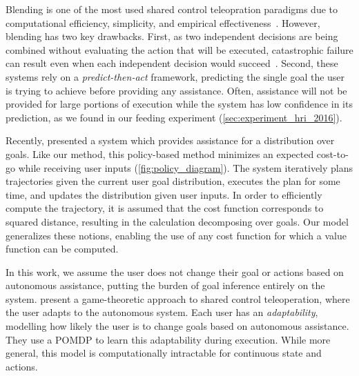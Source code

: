 Blending is one of the most used shared control teleopration paradigms due to computational efficiency, simplicity, and empirical effectiveness~\citep{li_2011, carlson_2012, dragan_2013_assistive, muelling_2015, gopinath_2016}. However, blending has two key drawbacks.
First, as two independent decisions are being combined without evaluating the action that will be executed, catastrophic failure can result even when each independent decision would succeed~\citep{trautman_2015}. Second, these systems rely on a \emph{predict-then-act} framework, predicting the single goal the user is trying to achieve before providing any assistance. Often, assistance will not be provided for large portions of execution while the system has low confidence in its prediction, as we found in our feeding experiment (\cref{sec:experiment_hri_2016}). %

Recently, \citet{hauser_2013} presented a system which provides assistance for a distribution over goals. Like our method, this policy-based method minimizes an expected cost-to-go while receiving user inputs (\cref{fig:policy_diagram}). The system iteratively plans trajectories given the current user goal distribution, executes the plan for some time, and updates the distribution given user inputs. In order to efficiently compute the trajectory, it is assumed that the cost function corresponds to squared distance, resulting in the calculation decomposing over goals. Our model generalizes these notions, enabling the use of any cost function for which a value function can be computed.

In this work, we assume the user does not change their goal or actions based on autonomous assistance, putting the burden of goal inference entirely on the system. \citet{nikolaidis_2017_shared} present a game-theoretic approach to shared control teleoperation, where the user adapts to the autonomous system. Each user has an \emph{adaptability}, modelling how likely the user is to change goals based on autonomous assistance. They use a POMDP to learn this adaptability during execution. While more general, this model is computationally intractable for continuous state and actions.



